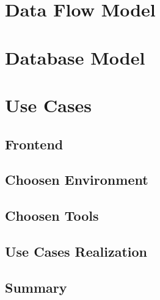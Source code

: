 \section{Data Flow Model}
\section{Database Model}
\section{Use Cases}
  \subsection{Frontend}
  \subsection{Choosen Environment}
  \subsection{Choosen Tools}
  \subsection{Use Cases Realization}
\subsection{Summary}